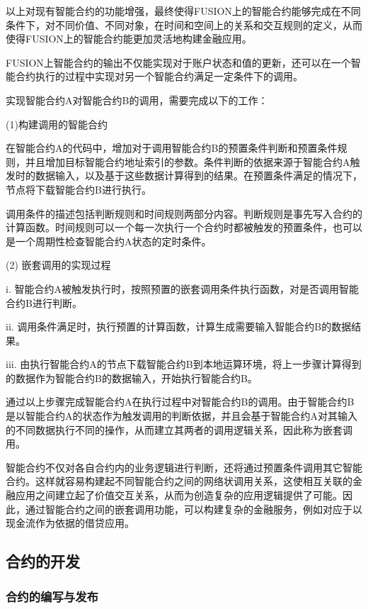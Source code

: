 \documentclass[a4paper,12pt]{article}
\begin{document}
以上对现有智能合约的功能增强，最终使得FUSION上的智能合约能够完成在不同条件下，对不同价值、不同对象，在时间和空间上的关系和交互规则的定义，从而使得FUSION上的智能合约能更加灵活地构建金融应用。

FUSION上智能合约的输出不仅能实现对于账户状态和值的更新，还可以在一个智能合约执行的过程中实现对另一个智能合约满足一定条件下的调用。

实现智能合约A对智能合约B的调用，需要完成以下的工作：

(1)构建调用的智能合约

在智能合约A的代码中，增加对于调用智能合约B的预置条件判断和预置条件规则，并且增加目标智能合约地址索引的参数。条件判断的依据来源于智能合约A触发时的数据输入，以及基于这些数据计算得到的结果。在预置条件满足的情况下，节点将下载智能合约B进行执行。

调用条件的描述包括判断规则和时间规则两部分内容。判断规则是事先写入合约的计算函数。时间规则可以一个每一次执行一个合约时都被触发的预置条件，也可以是一个周期性检查智能合约A状态的定时条件。

(2) 嵌套调用的实现过程

i. 智能合约A被触发执行时，按照预置的嵌套调用条件执行函数，对是否调用智能合约B进行判断。

ii. 调用条件满足时，执行预置的计算函数，计算生成需要输入智能合约B的数据结果。

iii. 由执行智能合约A的节点下载智能合约B到本地运算环境，将上一步骤计算得到的数据作为智能合约B的数据输入，开始执行智能合约B。

通过以上步骤完成智能合约A在执行过程中对智能合约B的调用。由于智能合约B是以智能合约A的状态作为触发调用的判断依据，并且会基于智能合约A对其输入的不同数据执行不同的操作，从而建立其两者的调用逻辑关系，因此称为嵌套调用。

智能合约不仅对各自合约内的业务逻辑进行判断，还将通过预置条件调用其它智能合约。这样就容易构建起不同智能合约之间的网络状调用关系，这使相互关联的金融应用之间建立起了价值交互关系，从而为创造复杂的应用逻辑提供了可能。因此，通过智能合约之间的嵌套调用功能，可以构建复杂的金融服务，例如对应于以现金流作为依据的借贷应用。

\subsection{合约的开发}

\subsubsection{合约的编写与发布}
\end{document}
